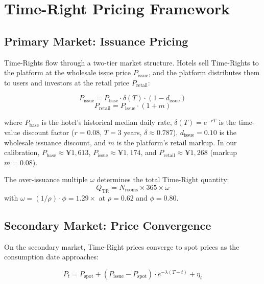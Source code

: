 \documentclass[12pt,a4paper]{article}
\begin{document}
\section{Time-Right Pricing Framework}

\subsection{Primary Market: Issuance Pricing}

Time-Rights flow through a two-tier market structure. Hotels sell Time-Rights to the platform at the wholesale issue price $P_{\text{issue}}$, and the platform distributes them to users and investors at the retail price $P_{\text{retail}}$:

\begin{equation}
    P_{\text{issue}} = P_{\text{base}} \cdot \delta(T) \cdot (1 - d_{\text{issue}})
\end{equation}
\begin{equation}
    P_{\text{retail}} = P_{\text{issue}} \cdot (1 + m)
\end{equation}

where $P_{\text{base}}$ is the hotel's historical median daily rate, $\delta(T) = e^{-rT}$ is the time-value discount factor ($r = 0.08$, $T = 3$ years, $\delta \approx 0.787$), $d_{\text{issue}} = 0.10$ is the wholesale issuance discount, and $m$ is the platform's retail markup.
In our calibration, $P_{\text{base}} \approx \yen 1,613$, $P_{\text{issue}} \approx \yen 1,174$, and $P_{\text{retail}} \approx \yen 1,268$ (markup $m = 0.08$).

The over-issuance multiple $\omega$ determines the total Time-Right quantity:
\begin{equation}
    Q_{\text{TR}} = N_{\text{rooms}} \times 365 \times \omega
\end{equation}
with $\omega = (1/\rho) \cdot \phi = 1.29\times$ at $\rho = 0.62$ and $\phi = 0.80$.

\subsection{Secondary Market: Price Convergence}

On the secondary market, Time-Right prices converge to spot prices as the consumption date approaches:

\begin{equation}
    P_t = P_{\text{spot}} + (P_{\text{issue}} - P_{\text{spot}}) \cdot e^{-\lambda(T-t)} + \eta_t
\end{equation}
\end{document}
